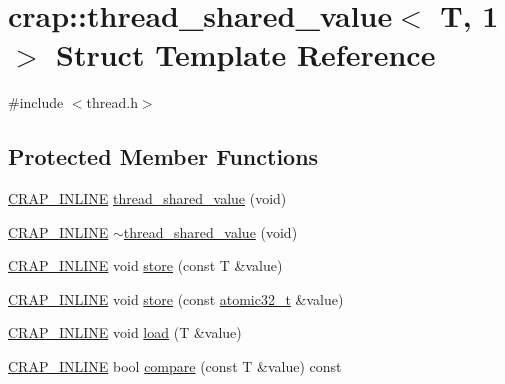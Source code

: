 \hypertarget{structcrap_1_1thread__shared__value_3_01_t_00_011_01_4}{\section{crap\+:\+:thread\+\_\+shared\+\_\+value$<$ T, 1 $>$ Struct Template Reference}
\label{structcrap_1_1thread__shared__value_3_01_t_00_011_01_4}
}


{\ttfamily \#include $<$thread.\+h$>$}

\subsection*{Protected Member Functions}
\begin{DoxyCompactItemize}
\item 
\hyperlink{config__x86_8h_a5a40526b8d842e7ff731509998bb0f1c}{C\+R\+A\+P\+\_\+\+I\+N\+L\+I\+N\+E} \hyperlink{structcrap_1_1thread__shared__value_3_01_t_00_011_01_4_a53cd4f94105728424f79b10c53cd121e}{thread\+\_\+shared\+\_\+value} (void)
\item 
\hyperlink{config__x86_8h_a5a40526b8d842e7ff731509998bb0f1c}{C\+R\+A\+P\+\_\+\+I\+N\+L\+I\+N\+E} \hyperlink{structcrap_1_1thread__shared__value_3_01_t_00_011_01_4_a43f5eecb968d3ca8cd0e498402301feb}{$\sim$thread\+\_\+shared\+\_\+value} (void)
\item 
\hyperlink{config__x86_8h_a5a40526b8d842e7ff731509998bb0f1c}{C\+R\+A\+P\+\_\+\+I\+N\+L\+I\+N\+E} void \hyperlink{structcrap_1_1thread__shared__value_3_01_t_00_011_01_4_a6b3aeca9dd3c1f5020b13da04d585261}{store} (const T \&value)
\item 
\hyperlink{config__x86_8h_a5a40526b8d842e7ff731509998bb0f1c}{C\+R\+A\+P\+\_\+\+I\+N\+L\+I\+N\+E} void \hyperlink{structcrap_1_1thread__shared__value_3_01_t_00_011_01_4_a0804cb5f82825654dfdb6cffb6467c82}{store} (const \hyperlink{structcrap_1_1atomic32__t}{atomic32\+\_\+t} \&value)
\item 
\hyperlink{config__x86_8h_a5a40526b8d842e7ff731509998bb0f1c}{C\+R\+A\+P\+\_\+\+I\+N\+L\+I\+N\+E} void \hyperlink{structcrap_1_1thread__shared__value_3_01_t_00_011_01_4_a13c6c57be6bd42f0410790de640fdbb6}{load} (T \&value)
\item 
\hyperlink{config__x86_8h_a5a40526b8d842e7ff731509998bb0f1c}{C\+R\+A\+P\+\_\+\+I\+N\+L\+I\+N\+E} bool \hyperlink{structcrap_1_1thread__shared__value_3_01_t_00_011_01_4_a093cfee1525c82dfa8b65546da3efa57}{compare} (const T \&value) const 

\end{DoxyCompactItemize}
